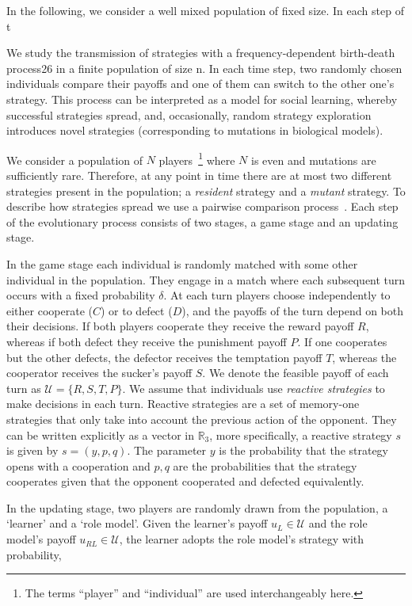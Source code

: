 \documentclass[11pt]{article}
\newcommand{\R}{\mathbb{R}}
\theoremstyle{plainCl1}
\theoremstyle{plainCl2}
\begin{document}
In the following, we consider a well mixed population of fixed size. In each
step of t

We study the transmission of strategies with a frequency-dependent birth-death
process26 in a finite population of size n. In each time step, two randomly
chosen individuals compare their payoffs and one of them can switch to the other
one's strategy. This process can be interpreted as a model for social learning,
whereby successful strategies spread, and, occasionally, random strategy
exploration introduces novel strategies (corresponding to mutations in
biological models).

We consider a population of \(N\) players~\footnote{The terms ``player'' and
``individual'' are used interchangeably here.} where \(N\) is even and mutations
are sufficiently rare. Therefore, at any point in time there are at most two
different strategies present in the population; a \textit{resident} strategy and
a \textit{mutant} strategy. To describe how strategies spread we use a pairwise
comparison process~\cite{Traulsen2006}. Each step of the evolutionary process
consists of two stages, a game stage and an updating stage.

In the game stage each individual is randomly matched with some other individual
in the population. They engage in a match where each subsequent turn occurs with
a fixed probability $\delta$. At each turn players choose independently to
either cooperate (\(C\)) or to defect (\(D\)), and the payoffs of the turn
depend on both their decisions. If both players cooperate they receive the
reward payoff \(R\), whereas if both defect they receive the punishment payoff
\(P\). If one cooperates but the other defects, the defector receives the
temptation payoff \(T\), whereas the cooperator receives the sucker's payoff
\(S\). We denote the feasible payoff of each turn as \(\mathcal{U} = \{R, S, T,
P\}\). We assume that individuals use \textit{reactive strategies} to make
decisions in each turn. Reactive strategies are a set of memory-one strategies
that only take into account the previous action of the opponent. They can be
written explicitly as a vector in \(\R_{3}\), more specifically, a reactive
strategy \(s\) is given by \(s=(y, p, q)\). The parameter \(y\) is the
probability that the strategy opens with a cooperation and \(p, q\) are the
probabilities that the strategy cooperates given that the opponent cooperated
and defected equivalently.

In the updating stage, two players are randomly drawn from the population, a
`learner' and a `role model'. Given the learner's payoff $u_L\!\in\!
\mathcal{U}$ and the role model's payoff $u_{RL}\!\in\! \mathcal{U}$, the
learner adopts the role model's strategy with probability,
\end{document}
